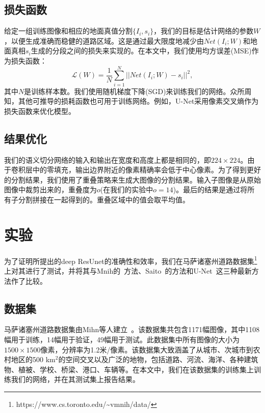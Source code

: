 \begin{translation}
\subsection{损失函数}

给定一组训练图像和相应的地面真值分割$\{I_i,s_i\}$，我们的目标是估计网络的参数$W$，以便生成准确而稳健的道路区域。这是通过最大限度地减少由$Net(I_i;W)$和地面真相$s_i$生成的分段之间的损失来实现的。在本文中，我们使用均方误差(MSE)作为损失函数：
\begin{equation}\label{Equ:mse}
  \mathcal{L}(W) = \frac{1}{N}\sum\limits^{N}_{i=1}||Net(I_i;W) - s_i||^2,
\end{equation}
其中$N$是训练样本数。我们使用随机梯度下降(SGD)来训练我们的网络。众所周知，其他可推导的损耗函数也可用于训练网络。例如，U-Net采用像素交叉熵作为损失函数来优化模型。

\subsection{结果优化}

我们的语义切分网络的输入和输出在宽度和高度上都是相同的，即$224\times224$。由于卷积层中的零填充，输出边界附近的像素精确率会低于中心像素。为了得到更好的分割结果，我们使用了重叠策略来生成大图像的分割结果。输入子图像是从原始图像中裁剪出来的，重叠度为$o$(在我们的实验中$o=14$)。最后的结果是通过将所有子分割拼接在一起得到的。重叠区域中的值会取平均值。

\section{实验}

为了证明所提出的deep ResUnet的准确性和效率，我们在马萨诸塞州道路数据集\footnote{https://www.cs.toronto.edu/\~{}vmnih/data/}上对其进行了测试，并将其与Mnih的~\cite{2}方法、Saito~\cite{5}的方法和U-Net~\cite{24}这三种最新方法作了比较。

\subsection{数据集}

马萨诸塞州道路数据集由Mihn等人建立~\cite{2}。该数据集共包含1171幅图像，其中1108幅用于训练，14幅用于验证，49幅用于测试。此数据集中所有图像的大小为$1500\times1500$像素，分辨率为1.2米/像素。该数据集大致涵盖了从城市、次城市到农村地区的500 km$^2$的空间交叉以及广泛的地物，包括道路、河流、海洋、各种建筑物、植被、学校、桥梁、港口、车辆等。在本文中，我们在该数据集的训练集上训练我们的网络，并在其测试集上报告结果。


\end{translation}
